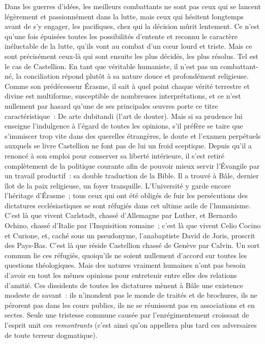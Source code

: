 \documentclass[french,twoside]{book} %
\newcommand{\astermono}{\medskip\centerline{\color{rubric}\large\selectfont{\syms ✻}}\medskip\par}%
\begin{document}
\astermono

\noindent Dans les guerres d’idées, les meilleurs combattants ne sont pas ceux qui se lancent légèrement et passionnément dans la lutte, mais ceux qui hésitent longtemps avant de s’y engager, les pacifiques, chez qui la décision mûrit lentement. Ce n’est qu’une fois épuisées toutes les possibilités d’entente et reconnu le caractère inéluctable de la lutte, qu’ils vont au combat d’un cœur lourd et triste. Mais ce sont précisément ceux-là qui sont ensuite les plus décidés, les plus résolus. Tel est le cas de Castellion. En tant que véritable humaniste, il n’est pas un combattant-né, la conciliation répond plutôt à sa nature douce et profondément religieuse. Comme son prédécesseur Érasme, il sait à quel point chaque vérité terrestre et divine est multiforme, susceptible de nombreuses interprétations, et ce n’est nullement par hasard qu’une de ses principales œuvres porte ce titre caractéristique : De arte dubitandi (l’art de douter). Mais si sa prudence lui enseigne l’indulgence à l’égard de toutes les opinions, s’il préfère se taire que s’immiscer trop vite dans des querelles étrangères, le doute et l’examen perpétuels auxquels se livre Castellion ne font pas de lui un froid sceptique. Depuis qu’il a renoncé à son emploi pour conserver sa liberté intérieure, il s’est retiré complètement de la politique courante afin de pouvoir mieux servir l’Évangile par un travail productif : sa double traduction de la Bible. Il a trouvé à Bâle, dernier îlot de la paix religieuse, un foyer tranquille. L’Université y garde encore l’héritage d’Érasme ; tous ceux qui ont été obligés de fuir les persécutions des dictatures ecclésiastiques se sont réfugiés dans cet ultime asile de l’humanisme. C’est là que vivent Carlstadt, chassé d’Allemagne par Luther, et Bernardo Ochino, chassé d’Italie par l’Inquisition romaine ; c’est là que vivent Celio Cocino et Curione, et, caché sous un pseudonyme, l’anabaptiste David de Joris, proscrit des Pays-Bas. C’est là que réside Castellion chassé de Genève par Calvin. Un sort commun lie ces réfugiés, quoiqu’ils ne soient nullement d’accord sur toutes les questions théologiques. Mais des natures vraiment humaines n’ont pas besoin d’avoir en tout les mêmes opinions pour entretenir entre elles des relations d’amitié. Ces dissidents de toutes les dictatures mènent à Bâle une existence modeste de savant : ils n’inondent pas le monde de traités et de brochures, ils ne pérorent pas dans les cours publics, ils ne se réunissent pas en associations et en sectes. Seule une tristesse commune causée par l’enrégimentement croissant de l’esprit unit ces \emph{remontrants} (c’est ainsi qu’on appellera plus tard ces adversaires de toute terreur dogmatique).\par
\end{document}
